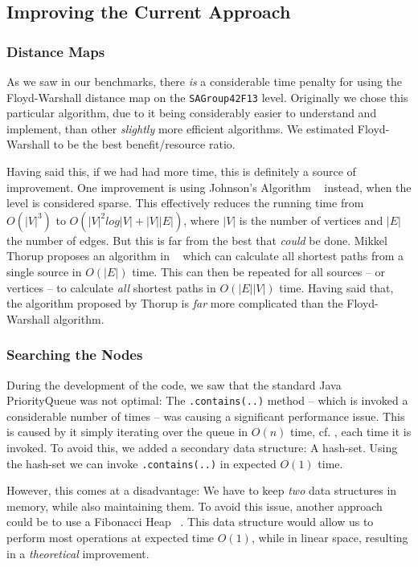 \documentclass[letterpaper]{article}
\begin{document}
	\subsection{Improving the Current Approach} 

		\subsubsection{Distance Maps}
			As we saw in our benchmarks, there \emph{is} a considerable time penalty for using the Floyd-Warshall distance map on the \verb=SAGroup42F13= level. Originally we chose this particular algorithm, due to it being considerably easier to understand and implement, than other \emph{slightly} more efficient algorithms. We estimated Floyd-Warshall to be the best benefit/resource ratio.

			Having said this, if we had had more time, this is definitely a source of improvement. One improvement is using Johnson's Algorithm ~\cite{jonhson} instead, when the level is considered sparse. This effectively reduces the running time from $O(|V|^3)$ to $O(|V|^2log|V|+|V||E|)$, where $|V|$ is the number of vertices and $|E|$ the number of edges. But this is far from the best that \emph{could} be done. Mikkel Thorup proposes an algorithm in ~\cite{thorup} which can calculate all shortest paths from a single source in $O(|E|)$ time. This can then be repeated for all sources -- or vertices -- to calculate \emph{all} shortest paths in $O(|E||V|)$ time. Having said that, the algorithm proposed by Thorup is \emph{far} more complicated than the Floyd-Warshall algorithm.


		\subsubsection{Searching the Nodes}
			During the development of the code, we saw that the standard Java PriorityQueue was not optimal: The \verb=.contains(..)= method -- which is invoked a considerable number of times -- was causing a significant performance issue. This is caused by it simply iterating over the queue in $O(n)$ time, cf. \cite{website:Java-Docs}, each time it is invoked. To avoid this, we added a secondary data structure: A hash-set. Using the hash-set we can invoke \verb=.contains(..)= in expected $O(1)$ time.

			However, this comes at a disadvantage: We have to keep \emph{two} data structures in memory, while also maintaining them. To avoid this issue, another approach could be to use a Fibonacci Heap ~\cite{fibonacci}. This data structure would allow us to perform most operations at expected time $O(1)$, while in linear space, resulting in a \emph{theoretical} improvement.
\end{document}
